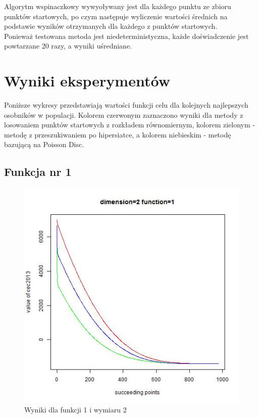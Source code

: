 \documentclass{article}
\begin{document}
Algorytm wspinaczkowy wywyoływany jest dla każdego punktu ze zbioru punktów startowych, po czym następuje wyliczenie wartości średnich na podstawie wyników otrzymanych dla każdego z punktów startowych.\\
Ponieważ testowana metoda jest niedeterministyczna, każde doświadczenie jest powtarzane 20 razy, a wyniki uśredniane.\\


\section{Wyniki eksperymentów}
Poniższe wykresy przedstawiają wartości funkcji celu dla kolejnych najlepszych osobników w populacji. Kolorem czerwonym zaznaczono wyniki dla metody z losowaniem punktów startowych z rozkładem równomiernym, kolorem zielonym - metodę z przeszukiwaniem po hipersiatce, a kolorem niebieskim - metodę bazującą na Poisson Disc.

\subsection{Funkcja nr 1}


\begin{figure}[H]
\centering
\includegraphics[scale=0.6]{dim_2__func_1}
\caption{Wyniki dla funkcji 1 i wymiaru 2}
\end{figure}
\end{document}
